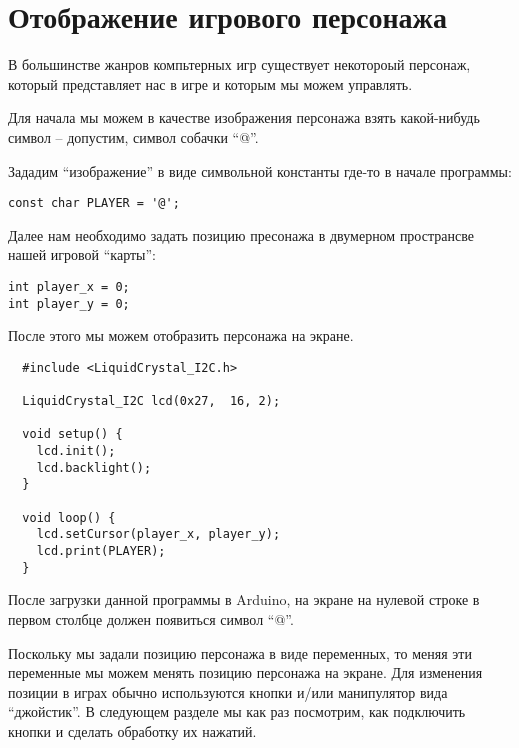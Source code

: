 \section{Отображение игрового персонажа}

В большинстве жанров компьтерных игр существует некотороый персонаж, который
представляет нас в игре и которым мы можем управлять.

Для начала мы можем в качестве изображения персонажа взять какой-нибудь символ
-- допустим, символ собачки ``@''.

Зададим ``изображение'' в виде символьной константы где-то в начале программы:

\begin{verbatim}
const char PLAYER = '@';
\end{verbatim}

Далее нам необходимо задать позицию пресонажа в двумерном пространсве нашей
игровой ``карты'':

\begin{verbatim}
int player_x = 0;
int player_y = 0;
\end{verbatim}

После этого мы можем отобразить персонажа на экране.

\begin{verbatim}
  #include <LiquidCrystal_I2C.h>

  LiquidCrystal_I2C lcd(0x27,  16, 2);

  void setup() {
    lcd.init();
    lcd.backlight();
  }

  void loop() {
    lcd.setCursor(player_x, player_y);
    lcd.print(PLAYER);
  }
\end{verbatim}

После загрузки данной программы в Arduino, на экране на нулевой строке в первом
столбце должен появиться символ ``@''.

Поскольку мы задали позицию персонажа в виде переменных, то меняя эти переменные
мы можем менять позицию персонажа на экране.  Для изменения позиции в играх
обычно используются кнопки и/или манипулятор вида ``джойстик''.  В следующем
разделе мы как раз посмотрим, как подключить кнопки и сделать обработку их
нажатий.
